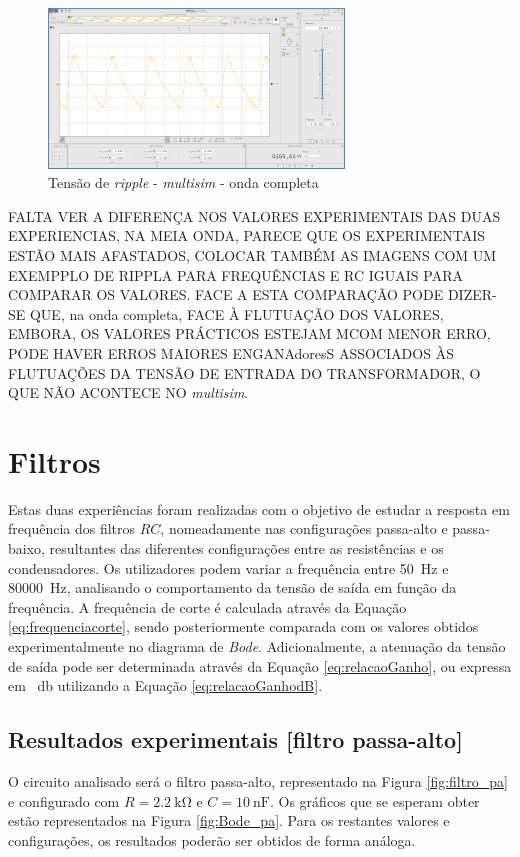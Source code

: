 \begin{figure}[hbtp]
	\centering
	\includegraphics[width=0.7\textwidth]{figures/OC_RIPPLE_VB_1N4007.png}
	\caption{Tensão de \textit{ripple} - \textit{multisim} - onda completa}
	\label{fig:ripplemultisim}
\end{figure}


FALTA VER A DIFERENÇA NOS VALORES EXPERIMENTAIS DAS DUAS EXPERIENCIAS, NA MEIA ONDA, PARECE QUE OS EXPERIMENTAIS ESTÃO MAIS AFASTADOS, COLOCAR TAMBÉM AS IMAGENS COM UM EXEMPPLO DE RIPPLA PARA FREQUÊNCIAS E RC IGUAIS PARA COMPARAR OS VALORES.
FACE A ESTA COMPARAÇÃO PODE DIZER-SE QUE, na onda completa, FACE À FLUTUAÇÃO DOS VALORES, EMBORA, OS VALORES PRÁCTICOS ESTEJAM MCOM MENOR ERRO, PODE HAVER ERROS MAIORES ENGANAdoresS ASSOCIADOS ÀS FLUTUAÇÕES DA TENSÃO DE ENTRADA DO TRANSFORMADOR, O QUE NÃO ACONTECE NO \textit{multisim}.

\section{Filtros}
\label{sec:resultados_filtros}
Estas duas experiências foram realizadas com o objetivo de estudar a resposta em frequência dos filtros $RC$, nomeadamente nas configurações passa-alto e passa-baixo, resultantes das diferentes configurações entre as resistências e os condensadores. Os utilizadores podem variar a frequência entre \SI{50}{\hertz} e \SI{80000}{\hertz}, analisando o comportamento da tensão de saída em função da frequência. A frequência de corte é calculada através da Equação \ref{eq:frequenciacorte}, sendo posteriormente comparada com os valores obtidos experimentalmente no diagrama de \textit{Bode}. Adicionalmente, a atenuação da tensão de saída pode ser determinada através da Equação \ref{eq:relacaoGanho}, ou expressa em \SI{}{\decibel} utilizando a Equação \ref{eq:relacaoGanhodB}.

\subsection{Resultados experimentais [filtro passa-alto]}
\label{sec:resultados_filtros_passaalto}
O circuito analisado será o filtro passa-alto, representado na Figura \ref{fig:filtro_pa} e configurado com $R=\SI{2.2}{\kilo\ohm}$ e $C=\SI{10}{\nano\farad}$. Os gráficos que se esperam obter estão representados na Figura \ref{fig:Bode_pa}. Para os restantes valores e configurações, os resultados poderão ser obtidos de forma análoga.

